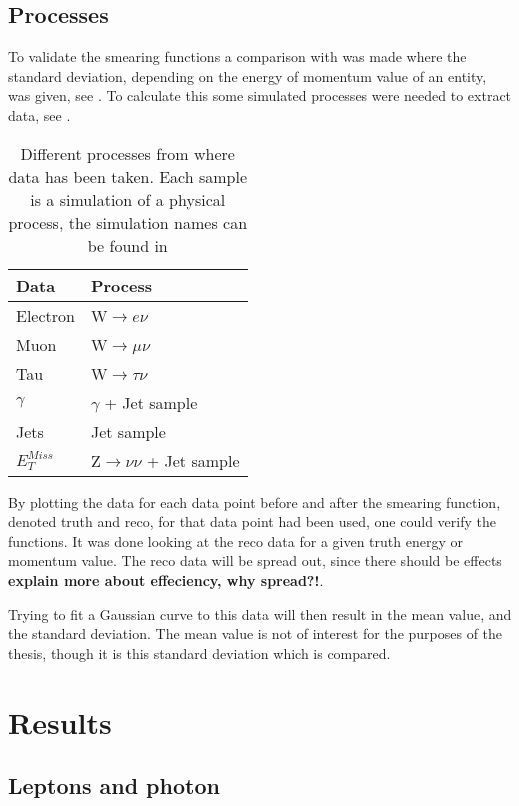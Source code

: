 \subsection{Processes}
To validate the smearing functions a comparison with \citep{ATL-PHYS-PUB-2013-004} was made where the standard deviation, depending on the energy of momentum value of an entity, was given, see . To calculate this some simulated processes were needed to extract data, see . 
\begin{SCtable}[][ht]
\begin{tabular}{|l|l|}
\hline
Data & Process \\ \hline
Electron & W$\rightarrow e\nu$ \\
Muon & W$\rightarrow \mu \nu$ \\
Tau & W$\rightarrow \tau \nu$ \\
$\gamma$ & $\gamma$ + Jet sample \\
Jets & Jet sample \\
$E_T^{Miss}$ & Z$\rightarrow \nu \nu$ + Jet sample \\ \hline
\end{tabular}
\caption{Different processes from where data has been taken. Each sample is a simulation of a physical process, the simulation names can be found in }
\label{tab:backproc}
\end{SCtable}

By plotting the data for each data point before and after the smearing function, denoted truth and reco, for that data point had been used, one could verify the functions. It was done looking at the reco data for a given truth energy or momentum value. The reco data will be spread out, since there should be effects \textbf{explain more about effeciency, why spread?!}. 

Trying to fit a Gaussian curve to this data will then result in the mean value, and the standard deviation. The mean value is not of interest for the purposes of the thesis, though it is this standard deviation which is compared. 


\section{Results}\label{cha:vali:sec:results}
\subsection{Leptons and photon}
